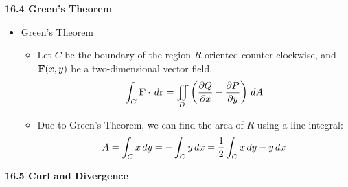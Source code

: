\newpage

\centerline{\bf 16.4 Green's Theorem}

  \begin{itemize}
    \item Green's Theorem
      \begin{itemize}
        \item Let $C$ be the boundary of the region $R$ oriented counter-clockwise, and $\mathbf{F}(x,y)$ be a two-dimensional vector field.
          \[
            \int_C \mathbf{F}\cdot\,d{\mathbf{r}} = \iint_D \left(\frac{\partial Q}{\partial x}-\frac{\partial P}{\partial y}\right)\,d{A}
          \]
        \item Due to Green's Theorem, we can find the area of $R$ using a line integral:
          \[ 
            A = \int_C x\,d{y} = -\int_C y\,d{x} = \frac{1}{2}\int_C x\,d{y}-y\,d{x}
          \]
      \end{itemize}
  \end{itemize}

\newpage

\centerline{\bf 16.5 Curl and Divergence}

